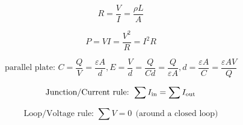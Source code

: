 \documentclass[12pt]{article}
\begin{document}
\begin{equation}
	R = \dfrac V I = \dfrac {\rho L} A
\end{equation}

\begin{equation}
	P = V I = \dfrac{V^2} R = I^2 R
\end{equation}

\begin{equation}
	\text{parallel plate: }
		C = \dfrac Q V = \dfrac{\varepsilon A} d,
		E = \dfrac V d = \dfrac Q {C d} = \dfrac Q {\varepsilon A},
		d = \dfrac{\varepsilon A} C = \dfrac{\varepsilon A V} Q
\end{equation}

\begin{equation}
	\text{Junction/Current rule: } \sum I_{\rm in} = \sum I_{\rm out}
\end{equation}

\begin{equation}
	\text{Loop/Voltage rule: } \sum V = 0 ~~ \text{(around a closed loop)}
\end{equation}
\end{document}
